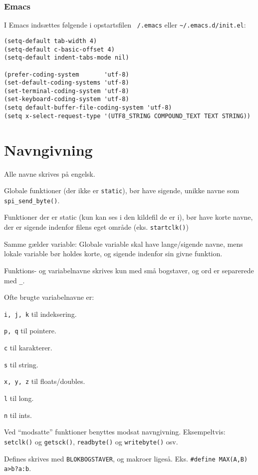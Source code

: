 \documentclass[article, 10pt]{memoir}
\let\tempone\itemize
\let\temptwo\enditemize
\renewenvironment{itemize}{\tempone\firmlist}{\temptwo}
\begin{document}
\begin{multicols}{2}
    \subsection{Emacs}
    I Emacs indsættes følgende i opstartsfilen \texttt{~/.emacs} eller \verb|~/.emacs.d/init.el|:
    \begin{lstlisting}
(setq-default tab-width 4)
(setq-default c-basic-offset 4)
(setq-default indent-tabs-mode nil)

(prefer-coding-system       'utf-8)
(set-default-coding-systems 'utf-8)
(set-terminal-coding-system 'utf-8)
(set-keyboard-coding-system 'utf-8)
(setq default-buffer-file-coding-system 'utf-8)
(setq x-select-request-type '(UTF8_STRING COMPOUND_TEXT TEXT STRING))
    \end{lstlisting}

    \chapter{Navngivning}
    \begin{itemize}
    \item Alle navne skrives på engelsk.
    \item Globale funktioner (der ikke er \texttt{static}), bør have sigende, unikke navne som \texttt{spi\_send\_byte()}.
    \item Funktioner der er static (kun kan ses i den kildefil de er i), bør have korte navne, der er sigende indenfor filens eget område (eks. \texttt{startclk()})
    \item Samme gælder variable: Globale variable skal have lange/sigende navne, mens lokale variable bør holdes korte, og sigende indenfor sin givne funktion.
    \item Funktions- og variabelnavne skrives kun med små bogstaver, og ord er separerede med \texttt{\_}.
    \item Ofte brugte variabelnavne er:
        \begin{itemize}
        \item \texttt{i, j, k} til indeksering.
        \item \texttt{p, q} til pointere.
        \item \texttt{c} til karakterer.
        \item \texttt{s} til string.
        \item \texttt{x, y, z} til floats/doubles.
        \item \texttt{l} til long.
        \item \texttt{n} til ints.
        \end{itemize}
    \item Ved ``modsatte'' funktioner benyttes modsat navngivning. Eksempeltvis: \texttt{setclk()} og \texttt{getsck()}, \texttt{readbyte()} og \texttt{writebyte()} osv.
    \item Defines skrives med \texttt{BLOKBOGSTAVER}, og makroer ligeså. Eks. \texttt{\#define MAX(A,B) a>b?a:b}. 


\end{itemize}
\end{multicols}
\end{document}
